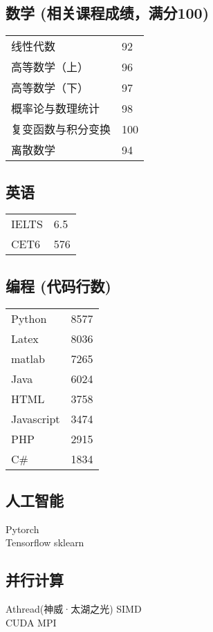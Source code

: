 \documentclass[]{deedy-resume-openfont}
\begin{document}
\begin{minipage}[t]{0.25\textwidth}
	\subsection{数学 {\small (相关课程成绩，满分100)}}
	\begin{tabular}{ll}
		线性代数           & 92  \\
		高等数学（上）     & 96  \\
		高等数学（下）     & 97  \\
		概率论与数理统计   & 98  \\
		复变函数与积分变换 & 100 \\
		离散数学 & 94 \\
	\end{tabular}
	\sectionsep
	\subsection{英语}
	\begin{tabular}{ll}
		IELTS & 6.5 \\
		CET6  & 576 \\
	\end{tabular}
	\sectionsep
	\subsection{编程 {\small (代码行数)}}
	\begin{tabular}{ll}
		Python     & 8577  \\
		Latex      & 8036  \\
		matlab     & 7265  \\
		Java       & 6024  \\
		HTML       & 3758  \\
		Javascript & 3474  \\
		PHP        & 2915  \\
		C\#        & 1834  \\
	\end{tabular}
	\sectionsep

	\subsection{人工智能}
	Pytorch \\
	Tensorflow \textbullet{} sklearn \\
    \sectionsep

	\subsection{并行计算}
	Athread(神威·太湖之光) \textbullet{} SIMD \\
	CUDA \textbullet{} MPI \\
    \sectionsep
    

\end{minipage}
\end{document}

